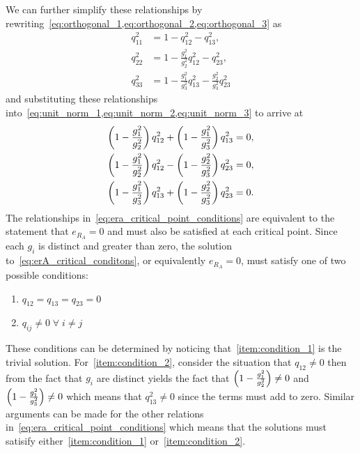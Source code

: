 We can further simplify these relationships by rewriting~\cref{eq:orthogonal_1,eq:orthogonal_2,eq:orthogonal_3} as
\begin{align}
    q_{11}^2 &= 1 - q_{12}^2 - q_{13}^2 , \\
    q_{22}^2 &= 1 - \frac{g_1^2}{g_2^2} q_{12}^2 - q_{23}^2, \\
    q_{33}^2 &= 1 - \frac{g_1^2}{g_3^2}q_{13}^2 - \frac{g_2^2}{g_3^2}q_{23}^2 
\end{align}
and substituting these relationships into~\cref{eq:unit_norm_1,eq:unit_norm_2,eq:unit_norm_3} to arrive at
\begin{subequations}\label{eq:era_critical_point_conditions}
\begin{align}
    \left( 1 - \frac{g_1^2}{g_2^2}  \right) q_{12}^2 + \left( 1 - \frac{g_1^2}{g_3^2} \right)q_{13}^2 &= 0 , \label{eq:era_condition_1}\\
    \left( 1 - \frac{g_1^2}{g_2^2} \right) q_{12}^2 - \left( 1 - \frac{g_2^2}{g_3^2} \right)q_{23}^2 &= 0 , \label{eq:era_condition_2}\\
    \left( 1 - \frac{g_1^2}{g_3^2} \right) q_{13}^2 + \left( 1 - \frac{g_2^2}{g_3^2} \right) q_{23}^2 &= 0.\label{eq:era_condition_3}
\end{align}
\end{subequations}     
The relationships in~\cref{eq:era_critical_point_conditions} are equivalent to the statement that \( e_{R_A} = 0 \) and must also be satisfied at each critical point.
Since each \( g_i \) is distinct and greater than zero, the solution to~\cref{eq:erA_critical_conditons}, or equivalently \( e_{R_A} = 0 \), must satisfy one of two possible conditions:
\begin{enumerate}[label=(\roman*)]
    \item \label{item:condition_1} \( q_{12} = q_{13} = q_{23} =0\)
    \item \label{item:condition_2} \( q_{ij} \neq 0 \; \forall \; i \neq j \)
\end{enumerate}
These conditions can be determined by noticing that~\cref{item:condition_1} is the trivial solution.
For~\cref{item:condition_2}, consider the situation that \( q_{12} \neq 0 \) then from the fact that \( g_i \) are distinct yields the fact that \( \left( 1 - \frac{g_1^2}{g_2^2}  \right) \neq 0 \) and \( \left( 1 - \frac{g_1^2}{g_3^2}  \right) \neq 0 \) which means that \( q_{13}^2 \neq 0 \) since the terms must add to zero.
Similar arguments can be made for the other relations in~\cref{eq:era_critical_point_conditions} which means that the solutions must satisify either~\cref{item:condition_1} or~\cref{item:condition_2}.

